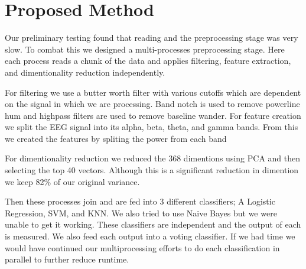 \section{Proposed Method}
\label{sec:proposed_method}

Our preliminary testing found that reading and the preprocessing stage
was very slow.
To combat this we designed a multi-processes preprocessing stage.
Here each process reads a chunk of the data and applies filtering,
feature extraction, and dimentionality reduction independently.

For filtering we use a butter worth filter with various cutoffs which are dependent on the signal in which we are processing.
Band notch is used to remove powerline hum and highpass filters are used to remove
baseline wander.
For feature creation we split the EEG signal into its alpha, beta, theta, and gamma bands.
From this we created the features by spliting the power from each band

For dimentionality reduction we reduced the 368 dimentions using PCA
and then selecting the top 40 vectors.
Although this is a significant reduction in dimention we keep 82\% of our
original variance.

Then these processes join and are fed into 3 different classifiers;
A Logistic Regression, SVM, and KNN.
We also tried to use Naive Bayes but we were unable to get it working.
These classifiers are independent and the output of each is measured.
We also feed each output into a voting classifier.
If we had time we would have continued our multiprocessing efforts to do each
classification in parallel to further reduce runtime.
